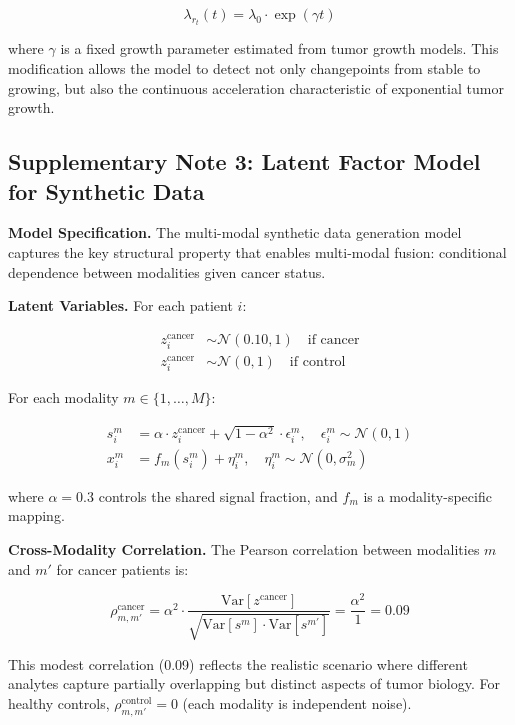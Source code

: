 \documentclass[10pt,a4paper]{article}
\begin{document}
\begin{equation}
\lambda_{r_t}(t) = \lambda_0 \cdot \exp(\gamma t)
\end{equation}

where $\gamma$ is a fixed growth parameter estimated from tumor growth models. This modification allows the model to detect not only changepoints from stable to growing, but also the continuous acceleration characteristic of exponential tumor growth.

\subsection*{Supplementary Note 3: Latent Factor Model for Synthetic Data}

\textbf{Model Specification.} The multi-modal synthetic data generation model captures the key structural property that enables multi-modal fusion: conditional dependence between modalities given cancer status.

\textbf{Latent Variables.} For each patient $i$:

\begin{align}
z_i^{\text{cancer}} &\sim \mathcal{N}(0.10, 1) \quad \text{if cancer} \\
z_i^{\text{cancer}} &\sim \mathcal{N}(0, 1) \quad \text{if control}
\end{align}

For each modality $m \in \{1, \ldots, M\}$:

\begin{align}
s_i^m &= \alpha \cdot z_i^{\text{cancer}} + \sqrt{1-\alpha^2} \cdot \epsilon_i^m, \quad \epsilon_i^m \sim \mathcal{N}(0, 1) \\
x_i^m &= f_m(s_i^m) + \eta_i^m, \quad \eta_i^m \sim \mathcal{N}(0, \sigma_m^2)
\end{align}

where $\alpha = 0.3$ controls the shared signal fraction, and $f_m$ is a modality-specific mapping.

\textbf{Cross-Modality Correlation.} The Pearson correlation between modalities $m$ and $m'$ for cancer patients is:

\begin{equation}
\rho_{m,m'}^{\text{cancer}} = \alpha^2 \cdot \frac{\text{Var}[z^{\text{cancer}}]}{\sqrt{\text{Var}[s^m] \cdot \text{Var}[s^{m'}]}} = \frac{\alpha^2}{1} = 0.09
\end{equation}

This modest correlation (0.09) reflects the realistic scenario where different analytes capture partially overlapping but distinct aspects of tumor biology. For healthy controls, $\rho_{m,m'}^{\text{control}} = 0$ (each modality is independent noise).
\end{document}
